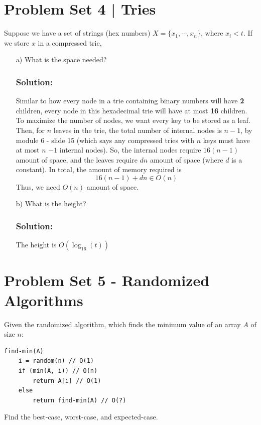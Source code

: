 \documentclass{report}
\begin{document}
\section*{Problem Set 4 | Tries}
Suppose we have a set of strings (hex numbers) $X = \{x_1, \cdots, x_n\}$, where $x_i < t$. If we store $x$ in a compressed trie,
\begin{itemize}
\item[a)] What is the space needed?
\subsubsection{Solution:}
Similar to how every node in a trie containing binary numbers will have \textbf{2} children, every node in this hexadecimal trie will have at most \textbf{16} children. To maximize the number of nodes, we want every key to be stored as a leaf. Then, for $n$ leaves in the trie, the total number of internal nodes is $n-1$, by module 6 - slide 15 (which says any compressed tries with $n$
 keys must have at most $n$ $-1$ internal nodes).
So, the internal nodes require $16(n-1)$ amount of space, and the leaves require $dn$ amount of space (where $d$ is a constant). In total, the amount of memory required is
$$16(n-1) + dn \in O(n)$$
Thus, we need $O(n)$ amount of space.
\item[b)] What is the height?
\subsubsection{Solution:}
The height is $O(\log_{16} (t))$
\end{itemize}
\section*{Problem Set 5 - Randomized Algorithms}
Given the randomized algorithm, which finds the minimum value of an array $A$ of size $n$:
\begin{lstlisting}
find-min(A)
	i = random(n) // O(1)
	if (min(A, i)) // O(n)
		return A[i] // O(1)
	else
		return find-min(A) // O(?)
\end{lstlisting}
Find the best-case, worst-case, and expected-case.
\end{document}
